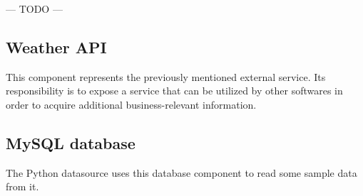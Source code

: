 \begin{center}
	--- TODO ---
\end{center}


\subsection{Weather API}

This component represents the previously mentioned external service. Its responsibility is to expose a service that can be utilized by other softwares in order to acquire additional business-relevant information.

\subsection{MySQL database}

The Python datasource uses this database component to read some sample data from it.




